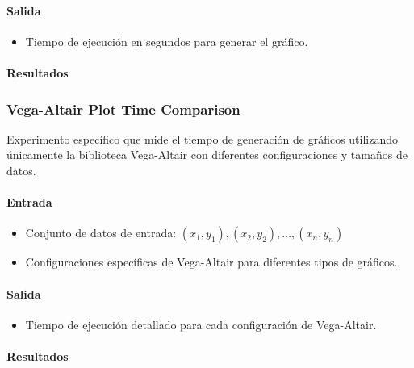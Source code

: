 \paragraph{Salida}
\begin{itemize}
    \item Tiempo de ejecución en segundos para generar el gráfico.
\end{itemize}

\paragraph{Resultados}
\vspace{0.5em}
\noindent

\AllLibrariesTimeComparison

\subsubsection{Vega-Altair Plot Time Comparison}
\label{vega_altair_plot_time}

Experimento específico que mide el tiempo de generación de gráficos utilizando únicamente la biblioteca Vega-Altair con diferentes configuraciones y tamaños de datos.

\paragraph{Entrada}
\begin{itemize}
    \item Conjunto de datos de entrada: \( (x_1, y_1), (x_2, y_2), \ldots, (x_n, y_n) \)
    \item Configuraciones específicas de Vega-Altair para diferentes tipos de gráficos.
\end{itemize}

\paragraph{Salida}
\begin{itemize}
    \item Tiempo de ejecución detallado para cada configuración de Vega-Altair.
\end{itemize}

\paragraph{Resultados}
\vspace{0.5em}
\noindent

